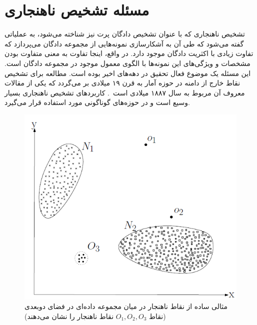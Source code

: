 \documentclass[12pt,a4paper]{report}
\begin{document}
	\section{مسئله تشخیص ناهنجاری}
تشخیص ناهنجاری که با عنوان تشخیص دادگان پرت نیز شناخته می‌شود، به عملیاتی گفته می‌شود که طی آن به آشکارسازی نمونه‌هایی از مجموعه دادگان می‌پردازد که تفاوت زیادی با اکثریت دادگان موجود دارد. در واقع، اینجا تفاوت به معنی متفاوت بودن مشخصات و ویژگی‌های این نمونه‌ها با الگوی معمول موجود در مجموعه دادگان است. این مسئله یک موضوع فعال تحقیق در دهه‌های اخیر بوده است. مطالعه برای تشخیص نقاط خارج از دامنه در حوزه آمار به قرن ۱۹ میلادی بر می‌گردد که یکی از مقالات معروف آن مربوط به سال ۱۸۸۷ میلادی است~\cite{Grubbs1969ProceduresFD}. کاربردهای تشخیص ناهنجاری بسیار وسیع است و در حوزه‌های گوناگونی مورد استفاده قرار می‌گیرد.\\

\begin{figure}[!hp]
	\begin{center}
		\includegraphics[width=0.5\linewidth]{./images/figures/anomaly-2d.png}

		\caption{
		مثالی ساده از نقاط ناهنجار در میان مجموعه داده‌ای در فضای دوبعدی (نقاط 
$O_1, O_2, O_3$
نقاط ناهنجار را نشان می‌دهند)
		\cite{V.Chandola}
		}		
		\label{fig:anomaly-example-1}
		\centering
	\end{center}
\end{figure}
\end{document}
